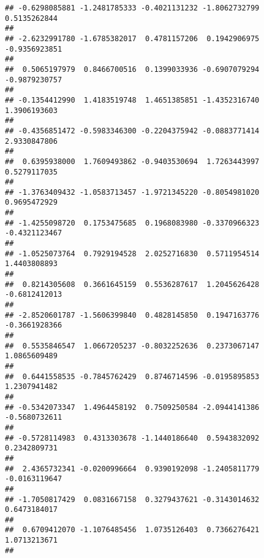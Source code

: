 \documentclass[]{article}
\begin{document}
\begin{verbatim}
## -0.6298085881 -1.2481785333 -0.4021131232 -1.8062732799  0.5135262844 
##                                                                       
## -2.6232991780 -1.6785382017  0.4781157206  0.1942906975 -0.9356923851 
##                                                                       
##  0.5065197979  0.8466700516  0.1399033936 -0.6907079294 -0.9879230757 
##                                                                       
## -0.1354412990  1.4183519748  1.4651385851 -1.4352316740  1.3906193603 
##                                                                       
## -0.4356851472 -0.5983346300 -0.2204375942 -0.0883771414  2.9330847806 
##                                                                       
##  0.6395938000  1.7609493862 -0.9403530694  1.7263443997  0.5279117035 
##                                                                       
## -1.3763409432 -1.0583713457 -1.9721345220 -0.8054981020  0.9695472929 
##                                                                       
## -1.4255098720  0.1753475685  0.1968083980 -0.3370966323 -0.4321123467 
##                                                                       
## -1.0525073764  0.7929194528  2.0252716830  0.5711954514  1.4403808893 
##                                                                       
##  0.8214305608  0.3661645159  0.5536287617  1.2045626428 -0.6812412013 
##                                                                       
## -2.8520601787 -1.5606399840  0.4828145850  0.1947163776 -0.3661928366 
##                                                                       
##  0.5535846547  1.0667205237 -0.8032252636  0.2373067147  1.0865609489 
##                                                                       
##  0.6441558535 -0.7845762429  0.8746714596 -0.0195895853  1.2307941482 
##                                                                       
## -0.5342073347  1.4964458192  0.7509250584 -2.0944141386 -0.5680732611 
##                                                                       
## -0.5728114983  0.4313303678 -1.1440186640  0.5943832092  0.2342809731 
##                                                                       
##  2.4365732341 -0.0200996664  0.9390192098 -1.2405811779 -0.0163119647 
##                                                                       
## -1.7050817429  0.0831667158  0.3279437621 -0.3143014632  0.6473184017 
##                                                                       
##  0.6709412070 -1.1076485456  1.0735126403  0.7366276421  1.0713213671 
##                                                                       

\end{verbatim}
\end{document}
